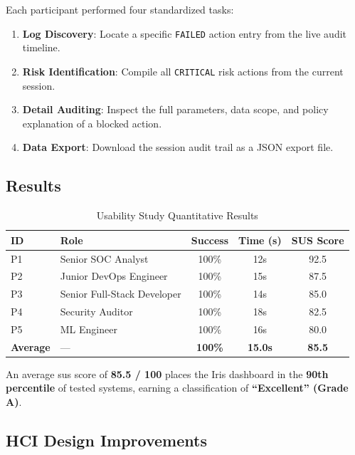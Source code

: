Each participant performed four standardized tasks:
\begin{enumerate}[leftmargin=1.5em]
  \item \textbf{Log Discovery}: Locate a specific \texttt{FAILED} action entry from the live audit timeline.
  \item \textbf{Risk Identification}: Compile all \texttt{CRITICAL} risk actions from the current session.
  \item \textbf{Detail Auditing}: Inspect the full parameters, data scope, and policy explanation of a blocked action.
  \item \textbf{Data Export}: Download the session audit trail as a JSON export file.
\end{enumerate}

\subsection{Results}

\begin{table}[H]
\centering
\caption{Usability Study Quantitative Results}
\begin{tabularx}{\textwidth}{l X c c c}
\toprule
\textbf{ID} & \textbf{Role} & \textbf{Success} & \textbf{Time (s)} & \textbf{SUS Score} \\
\midrule
P1 & Senior SOC Analyst          & 100\% & 12s  & 92.5 \\
P2 & Junior DevOps Engineer      & 100\% & 15s  & 87.5 \\
P3 & Senior Full-Stack Developer & 100\% & 14s  & 85.0 \\
P4 & Security Auditor            & 100\% & 18s  & 82.5 \\
P5 & ML Engineer                 & 100\% & 16s  & 80.0 \\
\midrule
\textbf{Average} & — & \textbf{100\%} & \textbf{15.0s} & \textbf{85.5} \\
\bottomrule
\end{tabularx}
\end{table}

\begin{successbox}
An average \gls{sus} score of \textbf{85.5 / 100} places the Iris dashboard in the \textbf{90th percentile} of tested systems, earning a classification of \textbf{``Excellent'' (Grade A)}.
\end{successbox}

\subsection{HCI Design Improvements}

